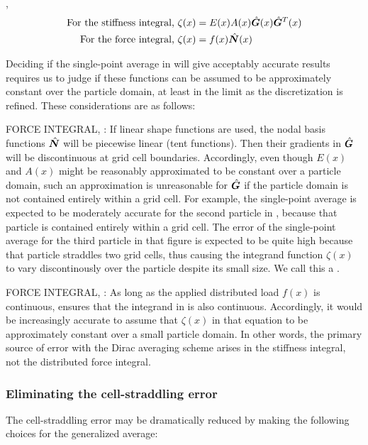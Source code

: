 , 
\begin{subequations}
\begin{align}
 \text{For the stiffness integral, } & \zeta(x)=E(x)A(x)\hat{\bm{G}}(x)\hat{\bm{G}}^T(x)
\label{eq:kintegrand}
\\
 \text{For the force integral, } & \zeta(x)=f(x)\hat{\bm{N}}(x)
\label{eq:fintegrand}
\end{align}
\label{none}
\end{subequations}

Deciding if the single-point average in  will give acceptably accurate results requires us to judge if these functions can be assumed to be approximately constant over the particle domain, at least in the limit as the discretization is refined. These considerations are as follows:
\begin{list}{}{}
\item FORCE INTEGRAL, :  If linear shape functions are used, the nodal basis functions $\hat{\bm{N}}$ will be piecewise linear (tent functions). Then their gradients in $\hat{\bm{G}}$ will be discontinuous at grid cell boundaries.  Accordingly, even though $E(x)$ and $A(x)$ might be reasonably approximated to be constant over a particle domain, such an approximation is unreasonable for $\hat{\bm{G}}$ if the particle domain is not contained entirely within a grid cell. For example, the single-point average is expected to be moderately accurate for the second particle in , because that particle is contained entirely within a grid cell. The error of the single-point average for the third particle in that figure is expected to be quite high because that particle straddles two grid cells, thus causing the integrand function $\zeta(x)$ to vary discontinously over the particle despite its small size. We call this a .
\item FORCE INTEGRAL,  : As long as the applied distributed load $f(x)$ is continuous,  ensures that the integrand in  is also continuous. Accordingly, it would be increasingly accurate to assume that $\zeta(x)$ in that equation to be approximately constant over a small particle domain. In other words, the primary source of error with the Dirac averaging scheme arises in the stiffness integral, not the distributed force integral.
\end{list}


\subsubsection{Eliminating the cell-straddling error}
The cell-straddling error may be dramatically reduced by making the following choices for the generalized average:

